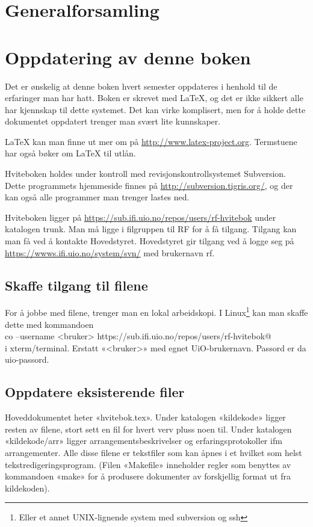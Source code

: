 \documentclass[11pt,norsk,a4paper,pointlessnumbers]{scrbook}
\begin{document}
\chapter{Generalforsamling}


\appendix

\chapter{Oppdatering av denne boken}
Det er ønskelig at denne boken hvert semester oppdateres i henhold til
de erfaringer man har hatt. Boken er skrevet med \LaTeX, og det er ikke
sikkert alle har kjennskap til dette systemet. Det kan virke komplisert,
men for å holde dette dokumentet oppdatert trenger man svært lite
kunnskaper.

\LaTeX{} kan man finne ut mer om på \url{http://www.latex-project.org}. Termstuene
har også bøker om \LaTeX{} til utlån.

Hviteboken holdes under kontroll med revisjonskontrollsystemet Subversion.
Dette programmets hjemmeside finnes på \url{http://subversion.tigris.org/}, og
der kan også alle programmer man trenger lastes ned.

Hviteboken ligger på \url{https://sub.ifi.uio.no/repos/users/rf-hvitebok} under katalogen trunk.
Man må ligge i filgruppen til RF for å få tilgang. Tilgang kan man få ved å 
kontakte Hovedstyret. Hovedstyret gir tilgang ved å logge seg på 
\url{https://wwws.ifi.uio.no/system/svn/} med brukernavn rf.

\section{Skaffe tilgang til filene}
For å jobbe med filene, trenger man en lokal arbeidskopi. I Linux\footnote{Eller et annet UNIX-lignende system med subversion og ssh} kan man
skaffe dette med kommandoen\\
\verb@svn co --username <bruker> https://sub.ifi.uio.no/repos/users/rf-hvitebok@\\
i xterm/terminal. Erstatt «<bruker>» med egnet UiO-brukernavn. Passord er da uio-passord.

\section{Oppdatere eksisterende filer}
Hoveddokumentet heter «hvitebok.tex». Under katalogen «kildekode» ligger
resten av filene, stort sett en fil for hvert verv pluss noen til.
Under katalogen «kildekode/arr» ligger arrangementsbeskrivelser og
erfaringsprotokoller ifm arrangementer. Alle disse filene er tekstfiler
som kan åpnes i et hvilket som helst tekstredigeringsprogram.
(Filen «Makefile» inneholder regler som benyttes av kommandoen «make»
for å produsere dokumenter av forskjellig format ut fra kildekoden).
\end{document}
